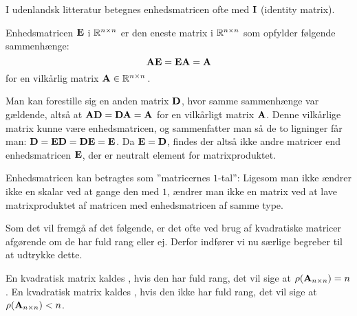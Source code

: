 \begin{aha}
I udenlandsk litteratur betegnes enhedsmatricen ofte med $ \mathbf{I} $ (identity matrix).
\end{aha}

\begin{theorem}[Enhedsmatricen]
Enhedsmatricen $\mathbf{E}$ i $\mathbb{R}^{n\times n}$ er den eneste matrix i $\mathbb{R}^{n\times n}$ som opfylder følgende sammenhænge:
\begin{equation}
\mathbf{A} \mathbf{E} = \mathbf{E} \mathbf{A} = \mathbf{A}
\end{equation}
for en vilkårlig matrix $ \mathbf{A} \in \mathbb{R}^{n\times n}\,$.
\end{theorem}

\begin{bevis}
Man kan forestille sig en anden matrix $ \mathbf{D} $, hvor samme sammenhænge var gældende, altså at $ \mathbf{A} \mathbf{D} = \mathbf{D} \mathbf{A} = \mathbf{A} $ for en vilkårligt matrix $ \mathbf{A} $. Denne vilkårlige matrix kunne være enhedsmatricen, og sammenfatter man så de to ligninger får man: $ \mathbf{D} = \mathbf{E} \mathbf{D} = \mathbf{D} \mathbf{E} = \mathbf{E} $. \bs
Da $ \mathbf{E} = \mathbf{D} $, findes der altså ikke andre matricer end enhedsmatricen $ \mathbf{E} $, der er neutralt element for matrixproduktet.
\end{bevis}

\begin{aha}
Enhedsmatricen kan betragtes som ''matricernes $1$-tal'': Ligesom man ikke ændrer ikke en skalar ved at gange den med $1$, ændrer man ikke en matrix ved at lave matrixproduktet af matricen med enhedsmatricen af samme type.
\end{aha}

Som det vil fremgå af det følgende, er det ofte ved brug af kvadratiske matricer afgørende om de har fuld rang eller ej. Derfor indfører vi nu særlige  begreber til at udtrykke dette.

\begin{definition}

En kvadratisk matrix kaldes , hvis den har fuld rang, det vil sige at $ \rho(\mathbf{A}_{n \times n}) = n $.\bs
En kvadratisk matrix kaldes , hvis den ikke har fuld rang, det vil sige at $ \rho(\mathbf{A}_{n \times n}) < n $. 

\end{definition}


